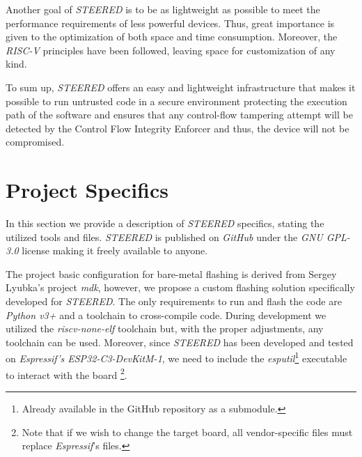 Another goal of \textit{STEERED} is to be as lightweight as possible to meet the
performance requirements of less powerful devices. Thus, great importance is given
to the optimization of both space and time consumption. Moreover, the \textit{RISC-V}
principles have been followed, leaving space for customization of any kind.

To sum up, \textit{STEERED} offers an easy and lightweight infrastructure that makes
it possible to run untrusted code in a secure environment protecting the execution
path of the software and ensures that any control-flow tampering attempt will be
detected by the Control Flow Integrity Enforcer and thus, the device will not be
compromised.

\section{Project Specifics}
\label{sec:project_specifics}

In this section we provide a description of \textit{STEERED} specifics, stating the
utilized tools and files. \textit{STEERED} is published on \textit{GitHub}\cite{repo}
under the \textit{GNU GPL-3.0} license\cite{gpl3} making it freely available to anyone.

The project basic configuration for bare-metal flashing is derived from Sergey Lyubka's
project \textit{mdk}\cite{mdk}, however, we propose a custom flashing solution specifically
developed for \textit{STEERED}. The only requirements to run and flash the code are
\textit{Python v3+} and a toolchain to cross-compile code. During development we
utilized the \textit{riscv-none-elf}\cite{toolchain} toolchain but, with the
proper adjustments, any toolchain can be used. Moreover, since \textit{STEERED}
has been developed and tested on \textit{Espressif's ESP32-C3-DevKitM-1}\cite{esp32c3},
we need to include the \textit{esputil}\footnote{Already available in the GitHub
repository as a submodule\cite{esputil}.} executable to interact with the board \footnote{Note
that if we wish to change the target board, all vendor-specific files must replace
\textit{Espressif}'s files.}.

